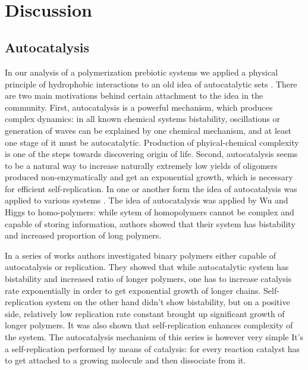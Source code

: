 \documentclass[twoside,twocolumn,9pt]{article}
\begin{document}
\,\\
\.\\
\,\\
\,\newline\\


\section{Discussion}

\subsection{Autocatalysis}
  In our analysis of a polymerization prebiotic systems we applied a physical principle of 
hydrophobic interactions to an old idea  of autocatalytic sets \cite{Kauffman1986,Eigen1978}. There are two main 
motivations behind certain attachment to the idea in the community. First, autocatalysis is a powerful mechanism, which 
produces complex dynamics: in all known chemical systems bistability, oscillations or generation of waves can be 
explained by one chemical mechanism, and at least one stage of it must be autocatalytic\cite{Prigozhin1990}. Production 
of phyical-chemical complexity is one of the steps towards discovering origin of life. Second, autocatalysis seems to be 
a natural way to increase naturally extremely low yields of oligomers produced non-enzymatically and get an 
exponential growth, which is necessary for efficient self-replication. In one or another form the idea of 
autocatalysis was applied to various systems 
\cite{segre1998graded,nowak2008prevolutionary,Wu2009,Hordijk2010,Walker2012,Chen2012,Markovitch2012}. The idea of 
autocatalysis was applied by Wu and Higgs to homo-polymers: while sytem of homopolymers cannot be 
complex and capable of storing information, authors showed that their system has bistability and 
increased proportion of long polymers. 

In a series of works 
\cite{nowak2008prevolutionary,Ohtsuki2009,Chen2012,Derr2012} authors investigated binary polymers 
either capable of autocatalysis or replication. They showed that while autocatalytic system has 
bistability and increased ratio of longer polymers, one has to increase catalysis rate 
exponentially in order to get exponential growth of longer chains. Self-replication system on the 
other hand didn't show bistability, but on a positive side, relatively low replication rate 
constant brought up significant growth of longer polymers. It was also shown that self-replication 
enhances complexity of the system. The autocatalysis mechanism of this series is however very 
simple It's a self-replication performed by means of catalysis: for every reaction catalyst has to 
get attached to a growing molecule and then dissociate from it.
\end{document}
